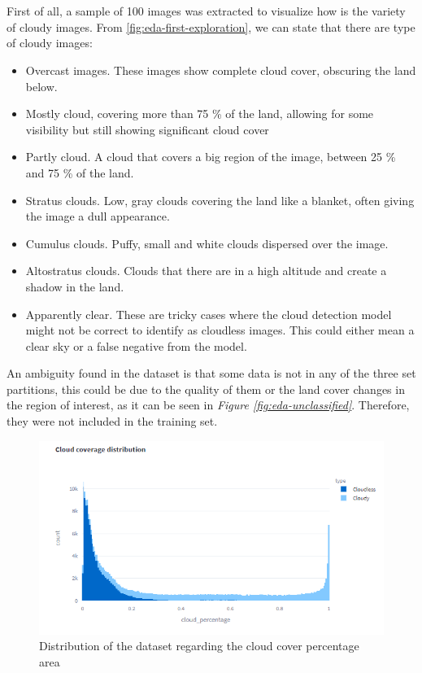 \\
\\
First of all, a sample of 100 images was extracted to visualize how is the variety of cloudy images. From \ref{fig:eda-first-exploration}, we can state that there are type of cloudy images:
\begin{itemize}
	\item Overcast images. These images show complete cloud cover, obscuring the land below.
	\item Mostly cloud, covering more than 75 \% of the land, allowing for some visibility but still showing significant cloud cover
	\item Partly cloud. A cloud that covers a big region of the image, between 25 \% and 75 \% of the land.
	\item Stratus clouds. Low, gray clouds covering the land like a blanket, often giving the image a dull appearance.
	\item Cumulus clouds. Puffy, small and white clouds dispersed over the image.
	\item Altostratus clouds. Clouds that there are in a high altitude and create a shadow in the land.
	\item Apparently clear. These are tricky cases where the cloud detection model might not be correct to identify as cloudless images. This could either mean a clear sky or a false negative from the model.
\end{itemize}
An ambiguity found in the dataset is that some data is not in any of the three set partitions, this could be due to the quality of them or the land cover changes in the region of interest, as it can be seen in \textit{Figure \ref{fig:eda-unclassified}}.  Therefore, they were not included in the training set.
\begin{figure}[H]
	\centering
	\includegraphics[width=16cm]{imgs/eda/cloud-coverage-distribution}
	\caption{Distribution of the dataset regarding the cloud cover percentage area}
	\label{fig:eda-cloud-percentage-area}
\end{figure} 

